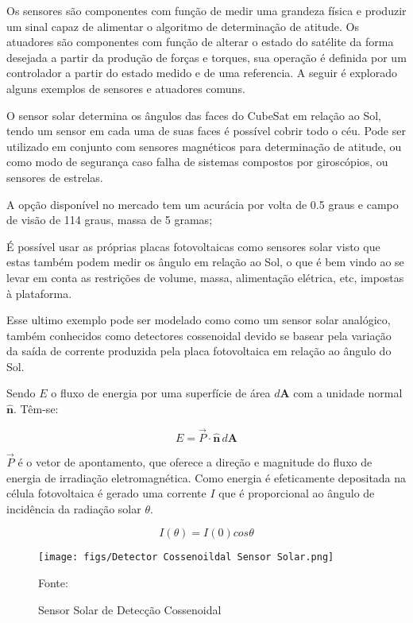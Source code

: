 Os sensores são componentes com  função de medir uma grandeza física e produzir um sinal capaz de alimentar o algoritmo de determinação de atitude. Os atuadores são componentes com função de alterar o estado do satélite da forma desejada a partir da produção de forças e torques, sua operação é definida por um controlador a partir do estado medido e de uma referencia. A seguir é explorado alguns exemplos de sensores e atuadores comuns.

O sensor solar determina os ângulos das faces do CubeSat em relação ao Sol, tendo um sensor em cada uma de suas faces é possível cobrir todo o céu. Pode ser utilizado em conjunto com sensores magnéticos para determinação de atitude, ou como modo de segurança caso falha de sistemas compostos por giroscópios, ou sensores de estrelas.

A opção disponível no mercado tem um acurácia por volta de 0.5 graus e campo de visão de 114 graus, massa de 5 gramas;

É possível usar as próprias placas fotovoltaicas como sensores solar visto que estas também podem medir os ângulo em relação ao Sol, o que é bem vindo ao se  levar em conta as restrições de volume, massa, alimentação elétrica, etc, impostas à plataforma\cite{baroni2020attitude}.

Esse ultimo exemplo pode ser modelado como como um sensor solar analógico, também conhecidos como detectores cossenoidal devido se basear pela variação da saída de corrente produzida pela placa fotovoltaica em relação ao ângulo do Sol.

Sendo $E$ o fluxo de energia por uma superfície de área $d\mathbf{A}$ com a unidade normal $\hat{\mathbf{n}}$. Têm-se:

\begin{equation}
E=\vec{P} \cdot \hat{\mathbf{n}}\, d\mathbf{A}
\end{equation}

$\vec{P}$ é o vetor de apontamento, que oferece a direção e magnitude do fluxo de energia de irradiação eletromagnética. Como energia é efeticamente depositada na célula fotovoltaica é gerado uma corrente $I$ que é proporcional ao ângulo de incidência da radiação solar $\theta$.

\begin{equation}
I\left (  \theta \right ) = I\left ( 0 \right )cos\theta
\end{equation}

\begin{figure}[htpb]
\centering
\texttt{[image: figs/Detector Cossenoildal Sensor Solar.png]}
\caption{Sensor Solar de Detecção Cossenoidal}
{Fonte: \cite[p.~156]{wertz2012spacecraft}}
\label{fig:4}
\end{figure}

